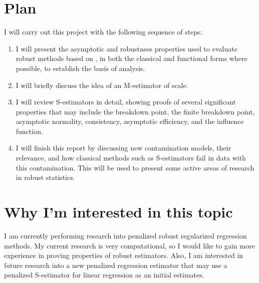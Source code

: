 \documentclass[]{STAT_547C}
\begin{document}
\section{Plan}

I will carry out this project with the following sequence of steps: 
\begin{enumerate}
    \item I will present the asymptotic and robustness properties used to evaluate robust methods based on \citet{maronna2019robust}, in both the classical and functional forms where possible, to establish the basis of analysis.
    \item I will briefly discuss the idea of an M-estimator of scale.
    \item I will review S-estimators in detail, showing proofs of several significant properties that may include the breakdown point, the finite breakdown point, asymptotic normality, consistency, asymptotic efficiency, and the influence function.
    \item I will finish this report by discussing new contamination models, their relevance, and how classical methods such as S-estimators fail in data with this contamination. This will be used to present some active areas of research in robust statistics.
\end{enumerate}



\section{Why I'm interested in this topic}


I am currently performing research into penalized robust regularized regression methods. My current research is very computational, so I would like to gain more experience in proving properties of robust estimators. Also, I am interested in future research into a new penalized regression estimator that may use a penalized S-estimator for linear regression as an initial estimates.


\printbibliography
\end{document}
